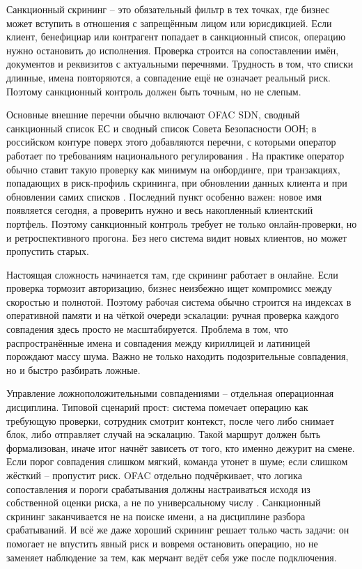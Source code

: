 Санкционный скрининг -- это обязательный фильтр в тех точках, где
бизнес может вступить в отношения с запрещённым лицом или
юрисдикцией. Если клиент, бенефициар или контрагент попадает в
санкционный список, операцию нужно остановить до исполнения.
Проверка строится на сопоставлении имён, документов и реквизитов с
актуальными перечнями. Трудность в том, что списки длинные, имена
повторяются, а совпадение ещё не означает реальный риск. Поэтому
санкционный контроль должен быть точным, но не слепым.

Основные внешние перечни обычно включают OFAC SDN, сводный
санкционный список ЕС и сводный список Совета Безопасности ООН; в
российском контуре поверх этого добавляются перечни, с которыми
оператор работает по требованиям национального регулирования
\cite{ofac-sanctions-list-service}\cite{eu-sanctions-info}\cite{unsc-consolidated-list}\cite{fz-115}.
На практике оператор обычно ставит такую проверку как минимум на
онбординге, при транзакциях, попадающих в риск-профиль скрининга,
при обновлении данных клиента и при обновлении самих списков
\cite{ofac-compliance-framework}. Последний пункт особенно
важен: новое имя появляется сегодня, а проверить нужно и весь
накопленный клиентский портфель. Поэтому санкционный контроль
требует не только онлайн-проверки, но и ретроспективного прогона.
Без него система видит новых клиентов, но может пропустить старых.

Настоящая сложность начинается там, где скрининг работает в онлайне.
Если проверка тормозит авторизацию, бизнес неизбежно ищет
компромисс между скоростью и полнотой. Поэтому рабочая система
обычно строится на индексах в оперативной памяти и на чёткой
очереди эскалации: ручная проверка каждого совпадения здесь просто
не масштабируется. Проблема в том, что распространённые имена и
совпадения между кириллицей и латиницей порождают массу шума.
Важно не только находить подозрительные совпадения, но и быстро
разбирать ложные.

Управление ложноположительными совпадениями -- отдельная
операционная дисциплина. Типовой сценарий прост: система помечает
операцию как требующую проверки, сотрудник смотрит контекст, после
чего либо снимает блок, либо отправляет случай на эскалацию. Такой
маршрут должен быть формализован, иначе итог начнёт зависеть от
того, кто именно дежурит на смене. Если порог совпадения слишком
мягкий, команда утонет в шуме; если слишком жёсткий -- пропустит
риск. OFAC отдельно подчёркивает, что логика сопоставления и пороги
срабатывания должны настраиваться исходя из собственной оценки
риска, а не по универсальному числу \cite{ofac-sanctions-faq}.
Санкционный скрининг заканчивается не на поиске имени, а на
дисциплине разбора срабатываний. И всё же даже хороший скрининг
решает только часть задачи: он помогает не впустить явный риск и
вовремя остановить операцию, но не заменяет наблюдение за тем, как
мерчант ведёт себя уже после подключения.

